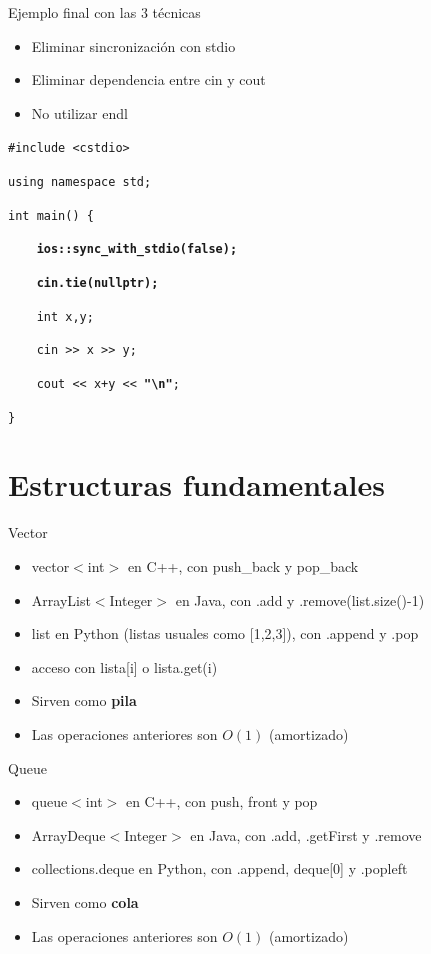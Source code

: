 \documentclass{beamer}
\begin{document}
  \begin{frame}{Ejemplo final con las 3 técnicas}
        
        \begin{itemize}
             \item Eliminar sincronización con stdio
             \item Eliminar dependencia entre cin y cout
             \item No utilizar endl
        \end{itemize}
        
  \texttt{\#include <cstdio>}
  
  \texttt{using namespace std;}
  
  \texttt{int main() \{}
  
  \textbf{\texttt{    \ \ \ ios::sync\_with\_stdio(false);}}
  
  \textbf{\texttt{    \ \ \ cin.tie(nullptr);}}
  
  \texttt{    \ \ \ int x,y;}
      
  \texttt{    \ \ \ cin >{}> x >{}> y;}
      
  \texttt{    \ \ \ cout <{}< x+y <{}< \textbf{"\textbackslash n"};}
      
  \texttt{\}}
  
  \end{frame}
  
\section{Estructuras fundamentales}
    
\begin{frame}{Vector}
    \begin{itemize}
        \item vector$<$int$>$ en C++, con push\_back y pop\_back
        \item ArrayList$<$Integer$>$ en Java, con .add y .remove(list.size()-1)
        \item list en Python (listas usuales como [1,2,3]), con .append y .pop
        \item acceso con lista[i] o lista.get(i)
        \item Sirven como \textbf{pila}
        \item Las operaciones anteriores son $O(1)$ (amortizado)
    \end{itemize}
\end{frame}

\begin{frame}{Queue}
    \begin{itemize}
        \item queue$<$int$>$ en C++, con push, front y pop
        \item ArrayDeque$<$Integer$>$ en Java, con .add, .getFirst y .remove
        \item collections.deque en Python, con .append, deque[0] y .popleft
        \item Sirven como \textbf{cola}
        \item Las operaciones anteriores son $O(1)$ (amortizado)
    \end{itemize}
\end{frame}
\end{document}
